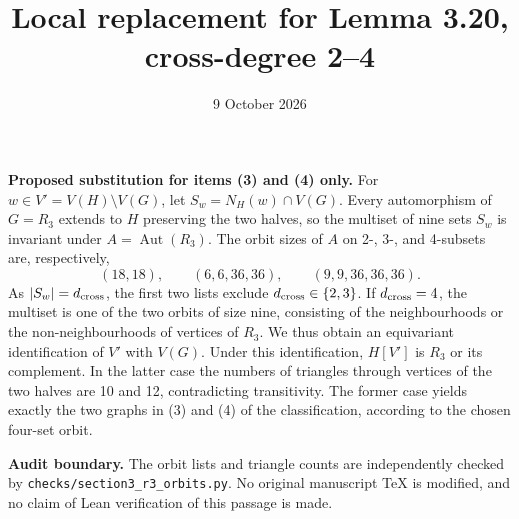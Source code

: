 \documentclass[11pt]{article}
\title{Local replacement for Lemma 3.20, cross-degree 2--4}
\date{9 October 2026}
\begin{document}
\maketitle
\noindent
\textbf{Proposed substitution for items (3) and (4) only.}
For \(w\in V'=V(H)\setminus V(G)\), let
\(S_w=N_H(w)\cap V(G)\). Every automorphism of \(G=R_3\)
extends to \(H\) preserving the two halves, so the
multiset of nine sets \(S_w\) is invariant under
\(A=\operatorname{Aut}(R_3)\).
The orbit sizes of \(A\) on 2-, 3-, and 4-subsets are,
respectively,
\[
(18,18),\qquad (6,6,36,36),\qquad
(9,9,36,36,36).
\]
As \(|S_w|=d_{\rm cross}\), the first two lists exclude
\(d_{\rm cross}\in\{2,3\}\). If \(d_{\rm cross}=4\),
the multiset is one of the two orbits of size nine,
consisting of the neighbourhoods or the non-neighbourhoods
of vertices of \(R_3\). We thus obtain an equivariant
identification of \(V'\) with \(V(G)\). Under this
identification, \(H[V']\) is \(R_3\) or its complement.
In the latter case the numbers of triangles through
vertices of the two halves are 10 and 12, contradicting
transitivity. The former case yields exactly the two
graphs in (3) and (4) of the classification, according
to the chosen four-set orbit.

\medskip
\noindent
\textbf{Audit boundary.} The orbit lists and triangle
counts are independently checked by
\texttt{checks/section3\_r3\_orbits.py}.
No original manuscript TeX is modified, and no claim of
Lean verification of this passage is made.
\end{document}
